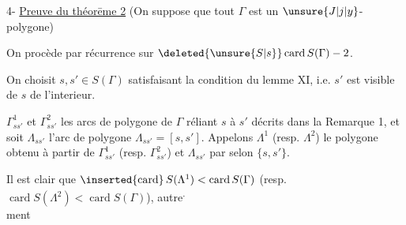 4- \uline{Preuve du théorēme 2} (On suppose que tout  $\Gamma$ est un $\unsure{J|j|y}$-polygone)

On procède par récurrence sur $\deleted{\unsure{S|s}}\mathop{\mathrm{card}} S(\Gamma)-2$.

On choisit $s,s'\in S(\Gamma)$ satisfaisant la condition du lemme XI, i.e. $s'$ est visible de $s$ de l'interieur.

  $\Gamma^{1}_{ss'}$ et $\Gamma^{2}_{ss'}$  les  arcs de polygone de $\Gamma$ réliant $s$ à $s'$ décrits dans la Remarque 1, et soit $\Lambda_{ss'}$ l'arc de polygone $\Lambda_{ss'}=[s,s']$. Appelons $\Lambda^{1}$  (resp. $\Lambda^{2}$) le polygone obtenu à partir de $\Gamma^{1}_{ss'}$ (resp. $\Gamma^{2}_{ss'}$) et $\Lambda_{ss'}$ par  selon $\{s,s'\}$.

Il est clair que $\inserted{\mathrm{card}}\,S(\Lambda^{1})<\mathop{\mathrm{card}} S(\Gamma)$ (resp. $\mathop{\mathrm{card}} S(\Lambda^{2})<\mathop{\mathrm{card}} S(\Gamma)$), autre\textsuperscript{.}\\ment
